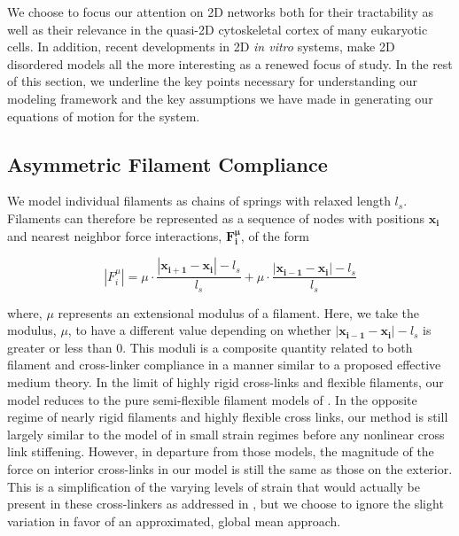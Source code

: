 \documentclass[10pt,letterpaper]{article}
\begin{document}
We choose to focus our attention on 2D networks both for their tractability as well as their relevance in the quasi-2D cytoskeletal cortex of many eukaryotic cells\cite{cellmech_flows}.  In addition, recent developments in 2D {\em in vitro} systems\cite{rheo_2D1,rheo_2D2}, make 2D disordered models all the more interesting as a renewed focus of study.  In the rest of this section, we underline the key points necessary for understanding our modeling framework and the key assumptions we have made in generating our equations of motion for the system.


\subsection*{Asymmetric Filament Compliance}
We model individual filaments as chains of springs with relaxed length $l_s$.  Filaments can therefore be represented as a sequence of nodes with positions $\mathbf{x_i}$ and nearest neighbor force interactions, $\mathbf{F^{\mu}_i}$, of the form

\begin{equation}
|F^{\mu}_i| = \mu\cdot\frac{|\mathbf{x_{i+1}}-\mathbf{x_i}|-l_s}{l_s} +\mu\cdot\frac{|\mathbf{x_{i-1}}-\mathbf{x_i}|-l_s}{l_s}
\end{equation}





where, $\mu$ represents an extensional modulus of a filament.   Here, we take the modulus, $\mu$, to have a different value depending on whether $|\mathbf{x_{i-1}}-\mathbf{x_i}|-l_s$ is greater or less than 0.  This moduli is a composite quantity related to both filament and cross-linker compliance in a manner similar to a proposed effective medium theory\cite{theo_crosslinknonlinear}.  In the limit of highly rigid cross-links and flexible filaments, our model reduces to the pure semi-flexible filament models of \cite{theo_hlm,theo_hlm2}.  In the opposite regime of nearly rigid filaments and highly flexible cross links, our method is still largely similar to the model of \cite{theo_crosslinknonlinear} in small strain regimes before any nonlinear cross link stiffening.  However, in departure from those models, the magnitude of the force on interior cross-links in our model is still the same as those on the exterior.  This is a simplification of the varying levels of strain that would actually be present in these cross-linkers as addressed in \cite{theo_crosslinknonlinear}, but we choose to ignore the slight variation in favor of an approximated, global mean approach.  
\end{document}
